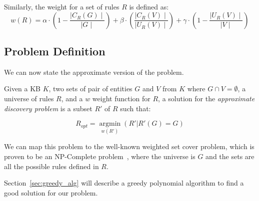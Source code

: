 
Similarly, the weight for a set of rules $R$ is defined as:
\begin{equation*}
w(R) = \alpha \cdot (1-\frac{\mid C_{R}(G)\mid}{\mid G \mid}) +\beta \cdot (\frac{\mid C_{R}(V) \mid}{\mid U_{R}(V)\mid})  +\gamma \cdot (1-\frac{\mid U_{R}(V)\mid}{\mid V \mid})
\end{equation*}

\subsection{Problem Definition}
We can now state the approximate version of the problem.


Given a KB $K$, two sets of pair of entities $G$ and $V$ from $K$ where $G \cap V = \emptyset$, a universe of rules $R$, and a $w$ weight function for $R$,
a solution for the \emph{approximate discovery problem} is a subset $R'$ of $R$  such that:

$$R_{opt}=\underset{w(R')}{\operatorname{argmin}}(R'|R'(G) = G)$$


We can map this problem to the well-known weighted set cover problem, which is proven to be an NP-Complete problem~\cite{chvatal1979greedy}, where the universe is $G$ and the sets are all the possible rules defined in $R$.


Section~\ref{sec:greedy_alg} will describe a greedy polynomial algorithm to find a good solution for our problem.



